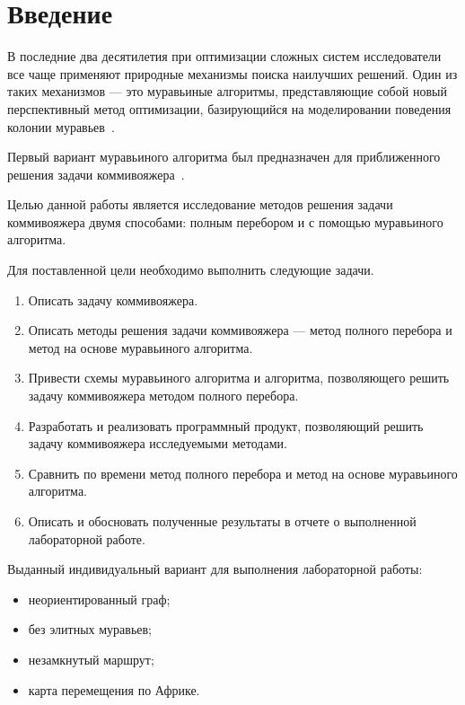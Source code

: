 \chapter*{Введение}

В последние два десятилетия при оптимизации сложных систем исследователи все чаще применяют природные механизмы поиска наилучших решений. 
Один из таких механизмов --- это муравьиные алгоритмы, представляющие собой новый перспективный метод оптимизации, базирующийся на моделировании поведения колонии муравьев~\cite{shtovba}. 

Первый вариант муравьиного алгоритма был предназначен для приближенного решения задачи коммивояжера~\cite{ershov}. 

Целью данной работы является исследование методов решения задачи коммивояжера двумя способами: полным перебором и с помощью муравьиного алгоритма.

Для поставленной цели необходимо выполнить следующие задачи.
\begin{enumerate}
	\item Описать задачу коммивояжера.
	\item Описать методы решения задачи коммивояжера --- метод полного перебора и метод на основе муравьиного алгоритма.
	\item Привести схемы муравьиного алгоритма и алгоритма, позволяющего решить задачу коммивояжера методом полного перебора.
	\item Разработать и реализовать программный продукт, позволяющий решить задачу коммивояжера исследуемыми методами.
	\item Сравнить по времени метод полного перебора и метод на основе муравьиного алгоритма.
	\item Описать и обосновать полученные результаты в отчете о выполненной лабораторной работе.
\end{enumerate}

Выданный индивидуальный вариант для выполнения лабораторной работы:
\begin{itemize}
	\item неориентированный граф;
	\item без элитных муравьев;
	\item незамкнутый маршрут;
	\item карта перемещения по Африке.
\end{itemize}